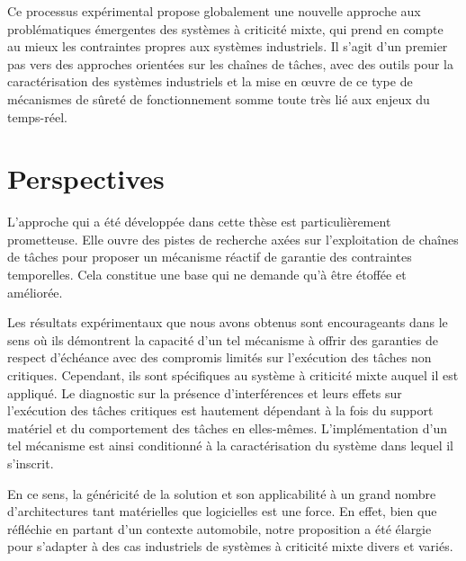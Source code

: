 \documentclass[a4paper,11pt,twoside]{StyleThese}
\begin{document}
Ce processus expérimental propose globalement une nouvelle approche aux problématiques émergentes des systèmes à criticité mixte, qui prend en compte au mieux les contraintes propres aux systèmes industriels. Il s'agit d'un premier pas vers des approches orientées sur les chaînes de tâches, avec des outils pour la caractérisation des systèmes industriels et la mise en œuvre de ce type de mécanismes de sûreté de fonctionnement somme toute très lié aux enjeux du temps-réel.


\section*{Perspectives}


L'approche qui a été développée dans cette thèse est particulièrement prometteuse. Elle ouvre des pistes de recherche axées sur l'exploitation de chaînes de tâches pour proposer un mécanisme réactif de garantie des contraintes temporelles. Cela constitue une base qui ne demande qu'à être étoffée et améliorée.

Les résultats expérimentaux que nous avons obtenus sont encourageants dans le sens où ils démontrent la capacité d'un tel mécanisme à offrir des garanties de respect d'échéance avec des compromis limités sur l'exécution des tâches non critiques. Cependant, ils sont spécifiques au système à criticité mixte auquel il est appliqué. Le diagnostic sur la présence d'interférences et leurs effets sur l'exécution des tâches critiques est hautement dépendant à la fois du support matériel et du comportement des tâches en elles-mêmes. L'implémentation d'un tel mécanisme est ainsi conditionné à la caractérisation du système dans lequel il s'inscrit.
 
En ce sens, la généricité de la solution et son applicabilité à un grand nombre d'architectures tant matérielles que logicielles est une force. En effet, bien que réfléchie en partant d'un contexte automobile, notre proposition a été élargie pour s'adapter à des cas industriels de systèmes à criticité mixte divers et variés. 
\end{document}
